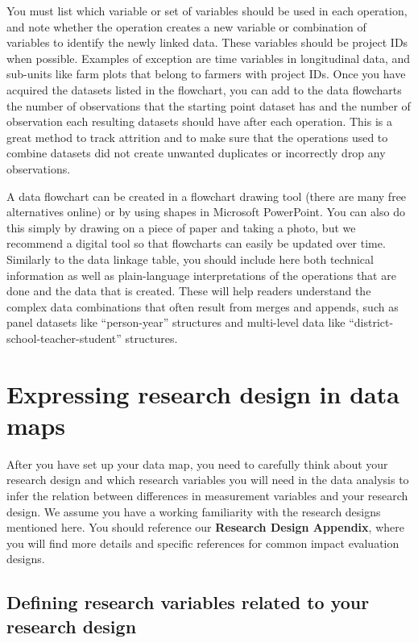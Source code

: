 You must list which variable or set of variables
should be used in each operation,
and note whether the operation creates a new variable or combination of variables
to identify the newly linked data.
These variables should be project IDs when possible.
Examples of exception are time variables in longitudinal data,
and sub-units like farm plots that belong to farmers with project IDs.
Once you have acquired the datasets listed in the flowchart,
you can add to the data flowcharts the number of observations that
the starting point dataset has
and the number of observation each resulting datasets
should have after each operation.
This is a great method to track attrition and to make sure that
the operations used to combine datasets did not create unwanted duplicates
or incorrectly drop any observations.

A data flowchart can be created in a flowchart drawing tool
(there are many free alternatives online) or
by using shapes in Microsoft PowerPoint.
You can also do this simply by drawing on a piece of paper and taking a photo,
but we recommend a digital tool
so that flowcharts can easily be updated over time.
Similarly to the data linkage table,
you should include here both technical information
as well as plain-language interpretations
of the operations that are done and the data that is created.
These will help readers understand the complex data combinations
that often result from merges and appends,
such as panel datasets like ``person-year'' structures
and multi-level data like ``district-school-teacher-student'' structures.

\section{Expressing research design in data maps}

After you have set up your data map,
you need to carefully think about your research design
and which research variables you will need in the data analysis
to infer the relation between differences in measurement variables
and your research design.
We assume you have a working familiarity
with the research designs mentioned here.
You should reference our \textbf{Research Design Appendix},
where you will find more details
and specific references for common impact evaluation designs.

\subsection{Defining research variables related to your research design}

